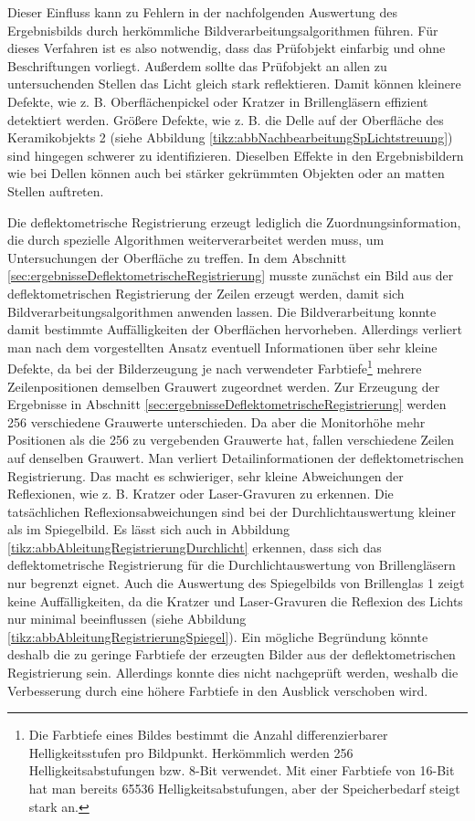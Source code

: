 \noindent
Dieser Einfluss kann zu Fehlern in der nachfolgenden Auswertung des Ergebnisbilds durch herkömmliche Bildverarbeitungsalgorithmen führen.
Für dieses Verfahren ist es also notwendig, dass das Prüfobjekt einfarbig und ohne Beschriftungen vorliegt.
Außerdem sollte das Prüfobjekt an allen zu untersuchenden Stellen das Licht gleich stark reflektieren.
Damit können kleinere Defekte, wie z. B. Oberflächenpickel oder Kratzer in Brillengläsern effizient detektiert werden.
Größere Defekte, wie z. B. die Delle auf der Oberfläche des Keramikobjekts 2 (siehe Abbildung \ref{tikz:abbNachbearbeitungSpLichtstreuung}) sind hingegen schwerer zu identifizieren.
Dieselben Effekte in den Ergebnisbildern wie bei Dellen können auch bei stärker gekrümmten Objekten oder an matten Stellen auftreten.

\p
Die deflektometrische Registrierung erzeugt lediglich die Zuordnungsinformation, die durch spezielle Algorithmen weiterverarbeitet werden muss, um Untersuchungen der Oberfläche zu treffen.
In dem Abschnitt \ref{sec:ergebnisseDeflektometrischeRegistrierung} musste zunächst ein Bild aus der deflektometrischen Registrierung der Zeilen erzeugt werden, damit sich Bildverarbeitungsalgorithmen anwenden lassen.
Die Bildverarbeitung konnte damit bestimmte Auffälligkeiten der Oberflächen hervorheben.
Allerdings verliert man nach dem vorgestellten Ansatz eventuell Informationen über sehr kleine Defekte, da bei der Bilderzeugung je nach verwendeter Farbtiefe\footnote
{
Die Farbtiefe eines Bildes bestimmt die Anzahl differenzierbarer Helligkeitsstufen pro Bildpunkt.
Herkömmlich werden 256 Helligkeitsabstufungen bzw. 8-Bit verwendet.
Mit einer Farbtiefe von 16-Bit hat man bereits 65536 Helligkeitsabstufungen, aber der Speicherbedarf steigt stark an.
%
} mehrere Zeilenpositionen demselben Grauwert zugeordnet werden.
Zur Erzeugung der Ergebnisse in Abschnitt \ref{sec:ergebnisseDeflektometrischeRegistrierung} werden 256 verschiedene Grauwerte unterschieden.
Da aber die Monitorhöhe mehr Positionen als die 256 zu vergebenden Grauwerte hat, fallen verschiedene Zeilen auf denselben Grauwert.
Man verliert Detailinformationen der deflektometrischen Registrierung.
Das macht es schwieriger, sehr kleine Abweichungen der Reflexionen, wie z. B. Kratzer oder Laser-Gravuren zu erkennen.
Die tatsächlichen Reflexionsabweichungen sind bei der Durchlichtauswertung kleiner als im Spiegelbild.
Es lässt sich auch in Abbildung \ref{tikz:abbAbleitungRegistrierungDurchlicht} erkennen, dass sich das deflektometrische Registrierung für die Durchlichtauswertung von Brillengläsern nur begrenzt eignet.
Auch die Auswertung des Spiegelbilds von Brillenglas 1 zeigt keine Auffälligkeiten, da die Kratzer und Laser-Gravuren die Reflexion des Lichts nur minimal beeinflussen (siehe Abbildung \ref{tikz:abbAbleitungRegistrierungSpiegel}).
Ein mögliche Begründung könnte deshalb die zu geringe Farbtiefe der erzeugten Bilder aus der deflektometrischen Registrierung sein.
Allerdings konnte dies nicht nachgeprüft werden, weshalb die Verbesserung durch eine höhere Farbtiefe in den Ausblick verschoben wird.

